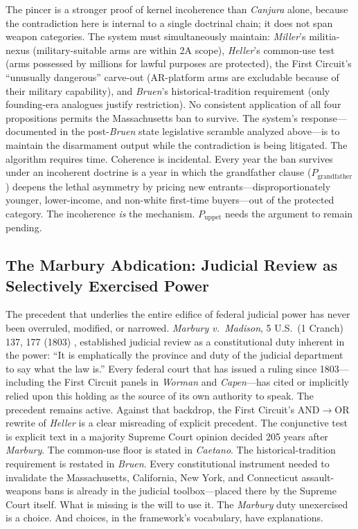 The pincer is a stronger proof of kernel incoherence than \textit{Canjura} alone, because the contradiction here is internal to a single doctrinal chain; it does not span weapon categories. The system must simultaneously maintain: \textit{Miller}'s militia-nexus (military-suitable arms are within 2A scope), \textit{Heller}'s common-use test (arms possessed by millions for lawful purposes are protected), the First Circuit's ``unusually dangerous'' carve-out (AR-platform arms are excludable because of their military capability), and \textit{Bruen}'s historical-tradition requirement (only founding-era analogues justify restriction). No consistent application of all four propositions permits the Massachusetts ban to survive. The system's response---documented in the post-\textit{Bruen} state legislative scramble analyzed above---is to maintain the disarmament output while the contradiction is being litigated. The algorithm requires time. Coherence is incidental. Every year the ban survives under an incoherent doctrine is a year in which the grandfather clause ($P_{\text{grandfather}}$) deepens the lethal asymmetry by pricing new entrants---disproportionately younger, lower-income, and non-white first-time buyers---out of the protected category. The incoherence \textit{is} the mechanism. $P_{\text{uppet}}$ needs the argument to remain pending.

\subsection{The Marbury Abdication: Judicial Review as Selectively Exercised Power}
\label{subsec:marbury_abdication}

The precedent that underlies the entire edifice of federal judicial power has never been overruled, modified, or narrowed. \textit{Marbury v.\ Madison}, 5 U.S.\ (1 Cranch) 137, 177 (1803) \cite{marbury_1803}, established judicial review as a constitutional duty inherent in the power: ``It is emphatically the province and duty of the judicial department to say what the law is.'' Every federal court that has issued a ruling since 1803---including the First Circuit panels in \textit{Worman} and \textit{Capen}---has cited or implicitly relied upon this holding as the source of its own authority to speak. The precedent remains active. Against that backdrop, the First Circuit's AND$\to$OR rewrite of \textit{Heller} is a clear misreading of explicit precedent. The conjunctive test is explicit text in a majority Supreme Court opinion decided 205 years after \textit{Marbury}. The common-use floor is stated in \textit{Caetano}. The historical-tradition requirement is restated in \textit{Bruen}. Every constitutional instrument needed to invalidate the Massachusetts, California, New York, and Connecticut assault-weapons bans is already in the judicial toolbox---placed there by the Supreme Court itself. What is missing is the will to use it. The \textit{Marbury} duty unexercised is a choice. And choices, in the framework's vocabulary, have explanations.

